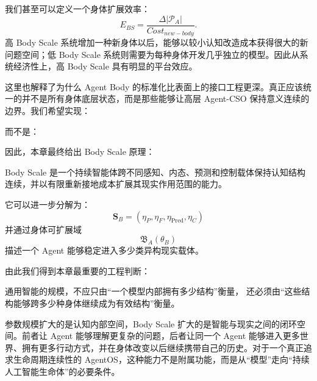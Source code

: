 我们甚至可以定义一个身体扩展效率：
\[
E_{BS}
=
\frac{
\Delta |\mathcal P_A|
}{
Cost_{new-body}
}.
\]
高 Body Scale 系统增加一种新身体以后，能够以较小认知改造成本获得很大的新问题空间；低 Body Scale 系统则需要为每种身体开发几乎独立的模型。因此从系统经济性上，高 Body Scale 具有明显的平台效应。

这里也解释了为什么 Agent Body 的标准化比表面上的接口工程更深。真正应该统一的并不是所有身体底层状态，而是那些能够让高层 Agent-CSO 保持意义连续的边界。我们希望实现：
\begin{statementbox}
\centering
{}
\end{statementbox}
而不是：
\begin{statementbox}
\centering
{}
\end{statementbox}

因此，本章最终给出 Body Scale 原理：

\begin{statementbox}
Body Scale 是一个持续智能体跨不同感知、内态、预测和控制载体保持认知结构连续，并以有限重新接地成本扩展其现实作用范围的能力。
\end{statementbox}

它可以进一步分解为：
\[
\boxed{
\mathbf S_B
=
(
\eta_P,
\eta_F,
\eta_{\mathrm{Pred}},
\eta_C
)
}
\]
并通过身体可扩展域
\[
\mathfrak B_A(\theta_B)
\]
描述一个 Agent 能够稳定进入多少类异构现实载体。

由此我们得到本章最重要的工程判断：

\begin{proposition*}
通用智能的规模，不应只由“一个模型内部拥有多少结构”衡量，
还必须由“这些结构能够跨多少种身体继续成为有效结构”衡量。
\end{proposition*}

参数规模扩大的是认知内部空间，Body Scale 扩大的是智能与现实之间的闭环空间。前者让 Agent 能够理解更复杂的问题，后者让同一个 Agent 能够进入更多世界、拥有更多行动方式，并在身体改变以后继续携带自己的历史。对于一个真正追求生命周期连续性的 AgentOS，这种能力不是附属功能，而是从“模型”走向“持续人工智能生命体”的必要条件。

